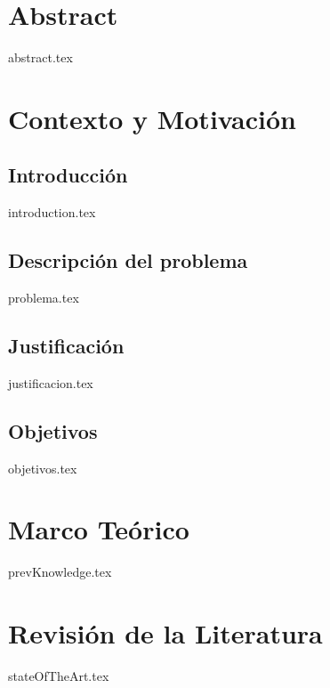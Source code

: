 \documentclass{report}
\begin{document}
\chapter*{Abstract}
{abstract.tex}

\tableofcontents

\chapter{Contexto y Motivación}

\section{Introducción}
{introduction.tex}

\section{Descripción del problema}
{problema.tex}

\section{Justificación}
{justificacion.tex}

\section{Objetivos}
{objetivos.tex}


\chapter{Marco Teórico}
{prevKnowledge.tex}

\chapter{Revisión de la Literatura}
{stateOfTheArt.tex}

\end{document}
